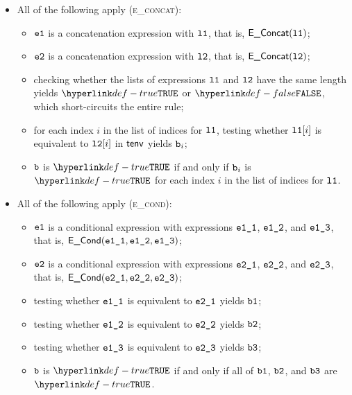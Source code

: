 \documentclass{book}
\newcommand\ProseOrTypeError[0]{\ProseTerminateAs{\TypeErrorConfig}}
\begin{document}
\begin{itemize}
  \item All of the following apply (\textsc{e\_concat}):
  \begin{itemize}
    \item $\texttt{e1}$ is a concatenation expression with $\texttt{l1}$, that is, $\textsf{E\_Concat}(\texttt{l1})$;
    \item $\texttt{e2}$ is a concatenation expression with $\texttt{l2}$, that is, $\textsf{E\_Concat}(\texttt{l2})$;
    \item checking whether the lists of expressions $\texttt{l1}$ and $\texttt{l2}$ have the same length yields
          $\True$ or $\False$, which short-circuits the entire rule;
    \item for each index $i$ in the list of indices for $\texttt{l1}$, testing whether $\texttt{l1}[i]$ is equivalent to $\texttt{l2}[i]$
          in $\textsf{tenv}$ yields $\texttt{b}_i$\ProseOrTypeError;
    \item $\texttt{b}$ is $\True$ if and only if $\texttt{b}_i$ is $\True$ for each index $i$ in the list of indices for $\texttt{l1}$.
  \end{itemize}

  \item All of the following apply (\textsc{e\_cond}):
  \begin{itemize}
    \item $\texttt{e1}$ is a conditional expression with expressions $\texttt{e1\_1}$, $\texttt{e1\_2}$, and $\texttt{e1\_3}$,
          that is, $\textsf{E\_Cond}(\texttt{e1\_1}, \texttt{e1\_2}, \texttt{e1\_3})$;
    \item $\texttt{e2}$ is a conditional expression with expressions $\texttt{e2\_1}$, $\texttt{e2\_2}$, and $\texttt{e2\_3}$,
          that is, $\textsf{E\_Cond}(\texttt{e2\_1}, \texttt{e2\_2}, \texttt{e2\_3})$;
    \item testing whether $\texttt{e1\_1}$ is equivalent to $\texttt{e2\_1}$ yields $\texttt{b1}$\ProseOrTypeError;
    \item testing whether $\texttt{e1\_2}$ is equivalent to $\texttt{e2\_2}$ yields $\texttt{b2}$\ProseOrTypeError;
    \item testing whether $\texttt{e1\_3}$ is equivalent to $\texttt{e2\_3}$ yields $\texttt{b3}$\ProseOrTypeError;
    \item $\texttt{b}$ is $\True$ if and only if all of $\texttt{b1}$, $\texttt{b2}$, and $\texttt{b3}$ are $\True$.
  \end{itemize}


\end{itemize}
\end{document}
